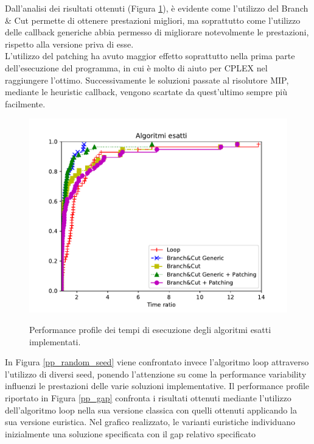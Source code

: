 Dall'analisi dei risultati ottenuti (Figura \ref{pp_exact}), è evidente come l'utilizzo del Branch \& Cut permette di ottenere prestazioni migliori, ma soprattutto come l'utilizzo delle callback generiche abbia permesso di migliorare notevolmente le prestazioni, rispetto alla versione priva di esse.\\
L'utilizzo del patching ha avuto maggior effetto soprattutto nella prima parte dell'esecuzione del programma, in cui è molto di aiuto per CPLEX nel raggiungere l'ottimo. Successivamente le soluzioni passate al risolutore MIP, mediante le heuristic callback, vengono scartate da quest'ultimo sempre più facilmente.\\
\begin{figure}[H] 
\begin{center} 
  \includegraphics[scale=0.75]{Images/pp_exact}\\ 
  \caption{\footnotesize{Performance profile dei tempi di esecuzione degli algoritmi esatti implementati.}}
  \label{pp_exact} 
\end{center} 
\end{figure}
In Figura \ref{pp_random_seed} viene confrontato invece l'algoritmo loop attraverso l'utilizzo di diversi seed, ponendo l'attenzione su come la performance variability influenzi le prestazioni delle varie soluzioni implementative.
Il performance profile riportato in Figura \ref{pp_gap} confronta i risultati ottenuti mediante l'utilizzo dell'algoritmo loop nella sua versione classica con quelli ottenuti applicando la sua versione euristica. Nel grafico realizzato, le varianti euristiche individuano inizialmente una soluzione specificata con il gap relativo specificato 
